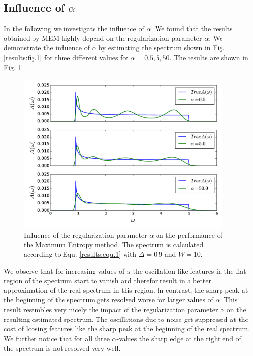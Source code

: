 \subsection*{Influence of $\alpha$}
In the following we investigate the influence of $\alpha$.
We found that the results obtained by MEM highly depend on the regularization parameter $\alpha$. We demonstrate the influence of $\alpha$ by estimating the spectrum shown in Fig. \ref{results:fig.1} for three different values for $\alpha = 0.5,5,50$. The results are shown in Fig. \ref{results:fig.2}
\begin{figure}[htbp]
	\centering
	\includegraphics[width=0.95\textwidth]{./images/BCS_varying_alpha.pdf}
	\caption{Influence of the regularization parameter $\alpha$ on the performance of the Maximum Entropy method. The spectrum is calculated according to Equ. \ref{results:equ.1} with $\Delta = 0.9$ and $W = 10$.}
	\label{results:fig.2}
\end{figure}
\FloatBarrier
We observe that for increasing values of $\alpha$ the oscillation like features in the flat region of the spectrum start to vanish and therefor result in a better approximation of the real spectrum in this region. In contrast, the sharp peak at the beginning of the spectrum gets resolved worse for larger values of $\alpha$. This result resembles very nicely the impact of the regularization parameter $\alpha$ on the resulting estimated spectrum. The oscillations due to noise get suppressed at the cost of loosing features like the sharp peak at the beginning of the real spectrum. We further notice that for all three $\alpha$-values the sharp edge at the right end of the spectrum is not resolved very well.
